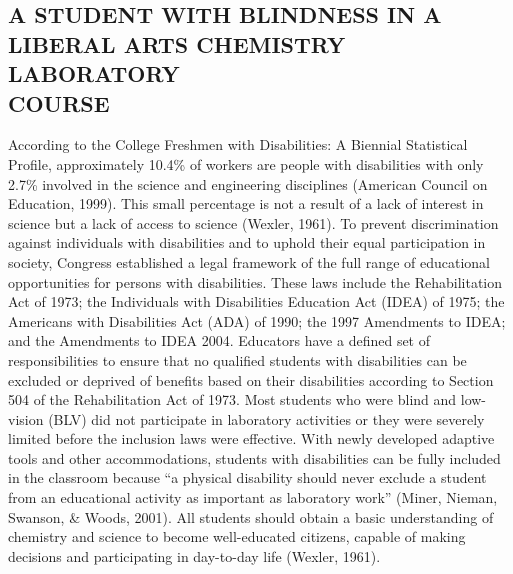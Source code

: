 \documentclass[11.5pt]{sig-alternate} %
\begin{document}
\begin{large}
\section*{A STUDENT WITH BLINDNESS IN A LIBERAL ARTS CHEMISTRY LABORATORY \\COURSE}

According to the College Freshmen with Disabilities: A Biennial Statistical Profile, approximately 10.4\% of workers are people with disabilities with only 2.7\% involved in the science and engineering disciplines (American Council on Education, 1999). This small percentage is not a result of a lack of interest in science but a lack of access to science (Wexler, 1961). To prevent discrimination against individuals with disabilities and to uphold their equal participation in society, Congress established a legal framework of the full range of educational opportunities for persons with disabilities. These laws include the Rehabilitation Act of 1973; the Individuals with Disabilities Education Act (IDEA) of 1975; the Americans with Disabilities Act (ADA) of 1990; the 1997 Amendments to IDEA; and the Amendments to IDEA 2004. Educators have a defined set of responsibilities to ensure that no qualified students with disabilities can be excluded or deprived of benefits based on their disabilities according to Section 504 of the Rehabilitation Act of 1973. Most students who were blind and low-vision (BLV) did not participate in laboratory activities or they were severely limited before the inclusion laws were effective. With newly developed adaptive tools and other accommodations, students with disabilities can be fully included in the classroom because “a physical disability should never exclude a student from an educational activity as important as laboratory work” (Miner, Nieman, Swanson, \& Woods, 2001). All students should obtain a basic understanding of chemistry and science to become well-educated citizens, capable of making decisions and participating in day-to-day life (Wexler, 1961).


\end{large}
\end{document}
